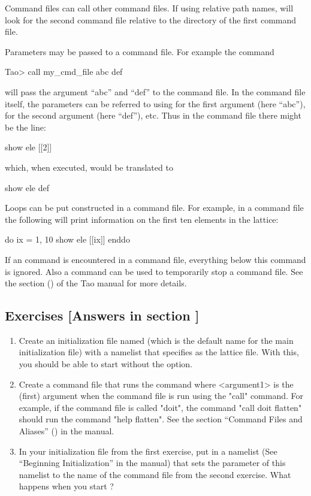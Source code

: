 \documentclass{hitec}     %
\begin{document}
Command files can call other command files. If using relative path names, \tao will look for the
second command file relative to the directory of the first command file.

Parameters may be passed to a command file. For example the command
\begin{code}
Tao> call my_cmd_file abc def
\end{code}
will pass the argument ``abc'' and ``def'' to the command file. In the command file itself, the parameters
can be referred to using  for the first argument (here ``abc''),  for
the second argument (here ``def''), etc. Thus in the command file there might be the line:
\begin{code}
show ele [[2]]
\end{code}
which, when executed, would be translated to
\begin{code}
show ele def
\end{code}

Loops can be put constructed in a command file. For example, in a command file the following
will print information on the first ten elements in the lattice:
\begin{code}
do ix = 1, 10
  show ele [[ix]]
enddo
\end{code}

If an  command is encountered in a command file, everything below this command is
ignored. Also a  command can be used to temporarily stop a command file. See the
 section () of the Tao manual for more details.

\subsection{Exercises [Answers in section ]}
\label{s:start.ex}

\begin{enumerate}[label=\thesection.\arabic{enumi}]
\item
Create an initialization file named  (which is the default name for the main
initialization file) with a  namelist that specifies  as the
lattice file. With this, you should be able to start \tao without the  option.
%
\item
Create a command file that runs the command  where <argument1> is the (first)
argument when the command file is run using the "call" command. For example, if the command file is
called "doit", the command "call doit flatten" should run the command "help flatten". See the
section ``Command Files and Aliases'' () in the \tao manual.
%
\item
In your  initialization file from the first exercise, put in a  namelist
(See  ``Beginning Initialization'' in the \tao manual) that sets the 
parameter of this namelist to the name of the command file from the second exercise. What happens when
you start \tao?
\end{enumerate}
\end{document}
